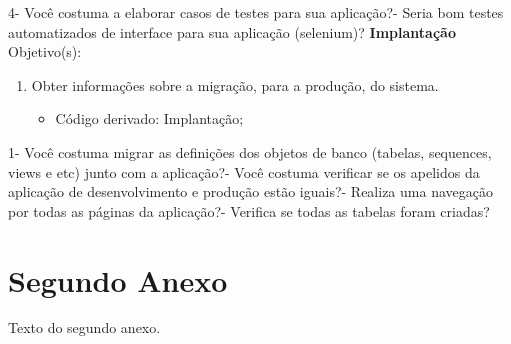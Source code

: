 \begin{anexosenv}
    4- Você costuma a elaborar casos de testes para sua aplicação?- Seria bom testes automatizados de interface para sua aplicação (selenium)?\newline
\newline
\textbf{Implantação}\newline\newline
Objetivo(s):
\begin{enumerate}
\item Obter informações sobre a migração, para a produção, do sistema.
\begin{itemize}
\item Código derivado: Implantação;
\end{itemize}
\end{enumerate}
    1- Você costuma migrar as definições dos objetos de banco (tabelas, sequences, views e etc) junto com a aplicação?- Você costuma verificar se os apelidos da aplicação de desenvolvimento e produção estão iguais?- Realiza uma navegação por todas as páginas da aplicação?- Verifica se todas as tabelas foram criadas?\newline
\newline
\chapter{Segundo Anexo}

Texto do segundo anexo.

\end{anexosenv}

